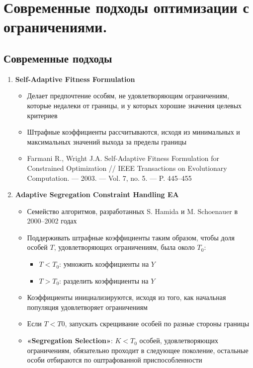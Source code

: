 \section{Современные подходы оптимизации с ограничениями.}

\subsection{Современные подходы}
\begin{enumerate}
    \item \textbf{Self-Adaptive Fitness Formulation}
    \begin{itemize}
        \item Делает предпочтение особям, не удовлетворяющим ограничениям, которые недалеки от границы, и у которых хорошие значения целевых критериев
        \item Штрафные коэффициенты рассчитываются, исходя из минимальных и максимальных значений выхода за пределы границы
        \item Farmani R., Wright J.A. Self-Adaptive Fitness Formulation for Constrained Optimization // IEEE
        Transactions on Evolutionary Computation. — 2003. — Vol. 7, no. 5. — P. 445–455
    \end{itemize}


    \item \textbf{Adaptive Segregation Constraint Handling EA}
    \begin{itemize}
        \item Семейство алгоритмов, разработанных S. Hamida и M. Schoenauer в 2000–2002 годах
        \item Поддерживать штрафные коэффициенты таким образом, чтобы доля особей $T$, удовлетворяющих ограничениям, была около $T_0$:
        \begin{itemize}
            \item  $T < T_0$: умножить коэффициенты на $Y$
            \item  $T > T_0$: разделить коэффициенты на $Y$
        \end{itemize}
        \item Коэффициенты инициализируются, исходя из того, как начальная популяция удовлетворяет ограничениям
        \item Если $T < T0$, запускать скрещивание особей по разные стороны границы
        \item  \textbf{«Segregation Selection»}: $K < T_0$ особей, удовлетворяющих ограничениям, обязательно проходит в следующее поколение, остальные особи отбираются по оштрафованной приспособленности


\end{itemize}
\end{enumerate}
